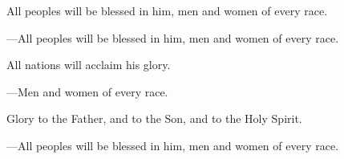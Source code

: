 \responsory

\begin{hangpar}
All peoples will be blessed in him, men and women of every race.

{\color{red}---\thinspace }All peoples will be blessed in him, men and women of every race.

\medskip All nations will acclaim his glory.

{\color{red}---\thinspace }Men and women of every race.

\medskip Glory to the Father, and to the Son, and to the Holy Spirit.

{\color{red}---\thinspace }All peoples will be blessed in him, men and women of every race.
\end{hangpar}